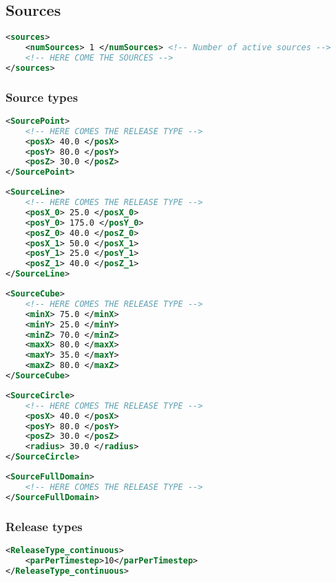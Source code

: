 \subsection{Sources}
\begin{lstlisting}[language=XML]
<sources>
    <numSources> 1 </numSources> <!-- Number of active sources -->
    <!-- HERE COME THE SOURCES -->
</sources>
\end{lstlisting}

\subsubsection{Source types}
\begin{lstlisting}[language=XML]
<SourcePoint>
    <!-- HERE COMES THE RELEASE TYPE -->
    <posX> 40.0 </posX>
    <posY> 80.0 </posY>
    <posZ> 30.0 </posZ>
</SourcePoint>
\end{lstlisting}

\begin{lstlisting}[language=XML]
<SourceLine>
    <!-- HERE COMES THE RELEASE TYPE -->
    <posX_0> 25.0 </posX_0>
    <posY_0> 175.0 </posY_0>
    <posZ_0> 40.0 </posZ_0>
    <posX_1> 50.0 </posX_1>
    <posY_1> 25.0 </posY_1>
    <posZ_1> 40.0 </posZ_1>
</SourceLine>
\end{lstlisting}

\begin{lstlisting}[language=XML]
<SourceCube>
    <!-- HERE COMES THE RELEASE TYPE -->
    <minX> 75.0 </minX>
    <minY> 25.0 </minY>
    <minZ> 70.0 </minZ>
    <maxX> 80.0 </maxX>
    <maxY> 35.0 </maxY>
    <maxZ> 80.0 </maxZ>
</SourceCube>
\end{lstlisting}

\begin{lstlisting}[language=XML]
<SourceCircle>
    <!-- HERE COMES THE RELEASE TYPE -->
    <posX> 40.0 </posX>
    <posY> 80.0 </posY>
    <posZ> 30.0 </posZ>
    <radius> 30.0 </radius>
</SourceCircle>
\end{lstlisting}

\begin{lstlisting}[language=XML]
<SourceFullDomain>
    <!-- HERE COMES THE RELEASE TYPE -->
</SourceFullDomain>
\end{lstlisting}

\subsubsection{Release types}
\begin{lstlisting}[language=XML]
<ReleaseType_continuous>
    <parPerTimestep>10</parPerTimestep>
</ReleaseType_continuous>
\end{lstlisting}

